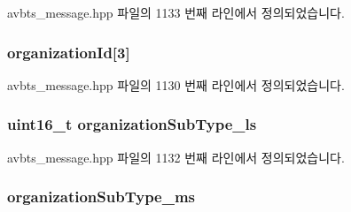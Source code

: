 avbts\+\_\+message.\+hpp 파일의 1133 번째 라인에서 정의되었습니다.

\subsubsection[{\texorpdfstring{organization\+Id}{organizationId}}]{ organization\+Id\mbox{[}3\mbox{]}\hspace{0.3cm}{\ttfamily [private]}}\hypertarget{class_signalling_t_l_v_a30511459852792f2f0e687625d99530f}{}\label{class_signalling_t_l_v_a30511459852792f2f0e687625d99530f}


avbts\+\_\+message.\+hpp 파일의 1130 번째 라인에서 정의되었습니다.

\subsubsection[{\texorpdfstring{organization\+Sub\+Type\+\_\+ls}{organizationSubType_ls}}]{\setlength{\rightskip}{0pt plus 5cm}uint16\+\_\+t organization\+Sub\+Type\+\_\+ls\hspace{0.3cm}{\ttfamily [private]}}\hypertarget{class_signalling_t_l_v_af5d5d56c0c74e3df1cae99986fafa44b}{}\label{class_signalling_t_l_v_af5d5d56c0c74e3df1cae99986fafa44b}


avbts\+\_\+message.\+hpp 파일의 1132 번째 라인에서 정의되었습니다.

\subsubsection[{\texorpdfstring{organization\+Sub\+Type\+\_\+ms}{organizationSubType_ms}}]{ organization\+Sub\+Type\+\_\+ms\hspace{0.3cm}{\ttfamily [private]}}\hypertarget{class_signalling_t_l_v_aaad8acec162fb623707af758bc49f425}{}\label{class_signalling_t_l_v_aaad8acec162fb623707af758bc49f425}


